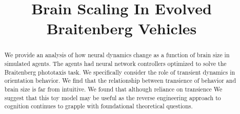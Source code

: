 \documentclass[letterpaper]{article}
\title{Brain Scaling In Evolved Braitenberg Vehicles}
\begin{document}
\maketitle

\begin{abstract}
  We provide an analysis of how neural dynamics
  change as a function of brain size in simulated agents. The agents 
  had neural network controllers optimized to solve the
  Braitenberg phototaxis task. We specifically consider the role of transient
  dynamics in orientation behavior. We find that the relationship between 
  transience of behavior and brain size is far from intuitive. We found that 
  although reliance on transience 
  We suggest that 
  this toy model may be useful as the reverse engineering approach to 
  cognition continues to grapple with foundational theoretical questions.
\end{abstract}
\end{document}
